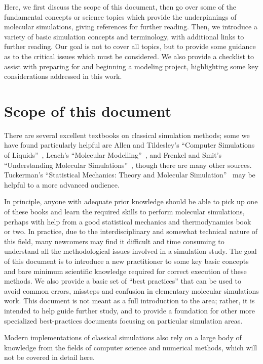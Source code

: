\documentclass[9pt,bestpractices]{livecoms}
\begin{document}
Here, we first discuss the scope of this document, then go over some of the fundamental concepts or science topics which provide the underpinnings of molecular simulations, giving references for further reading.
Then, we introduce a variety of basic simulation concepts and terminology, with additional links to further reading.
Our goal is not to cover all topics, but to provide some guidance as to the critical issues which must be considered.
We also provide a checklist to assist with preparing for and beginning a modeling project, highlighting some key considerations addressed in this work.

\section{Scope of this document}
\label{sec:scope}

There are several excellent textbooks on classical simulation methods; some we have found particularly helpful are Allen and Tildesley's ``Computer Simulations of Liquids''~\cite{allen_computer_2017}, Leach's ``Molecular Modelling''~\cite{LeachBook}, and Frenkel and Smit's ``Understanding Molecular Simulations''~\cite{Frenkel:2001:}, though there are many other sources.
Tuckerman's ``Statistical Mechanics: Theory and Molecular Simulation''~\cite{Tuckerman:2010:} may be helpful to a more advanced audience.

In principle, anyone with adequate prior knowledge should be able to pick up one of these books and learn the required skills to perform molecular simulations, perhaps with help from a good statistical mechanics and thermodynamics book or two.
In practice, due to the interdisciplinary and somewhat technical nature of this field, many newcomers may find it difficult and time consuming to understand all the methodological issues involved in a simulation study.  
The goal of this document is to introduce a new practitioner to some key basic concepts and bare minimum scientific knowledge required for correct execution of these methods. 
We also provide a basic set of ``best practices'' that can be used to avoid common errors, missteps and confusion in elementary molecular simulations work.
This document is not meant as a full introduction to the area; rather, it is intended to help guide further study, and to provide a foundation for other more specialized best-practices documents focusing on particular simulation areas.

Modern implementations of classical simulations also rely on a large body of knowledge from the fields of computer science and numerical methods, which will
not be covered in detail here.
\end{document}
